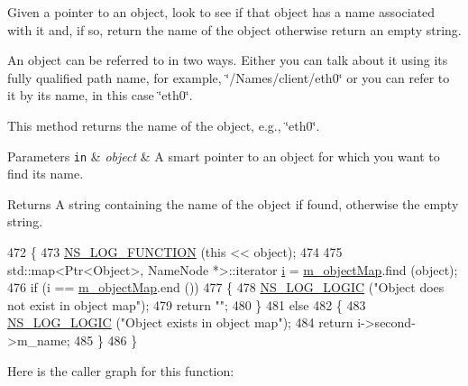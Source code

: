 Given a pointer to an object, look to see if that object has a name associated with it and, if so, return the name of the object otherwise return an empty string. 

An object can be referred to in two ways. Either you can talk about it using its fully qualified path name, for example, \char`\"{}/\+Names/client/eth0\char`\"{} or you can refer to it by its name, in this case \char`\"{}eth0\char`\"{}.

This method returns the name of the object, e.\+g., \char`\"{}eth0\char`\"{}.


\begin{DoxyParams}[1]{Parameters}
\mbox{\tt in}  & {\em object} & A smart pointer to an object for which you want to find its name.\\
\hline
\end{DoxyParams}
\begin{DoxyReturn}{Returns}
A string containing the name of the object if found, otherwise the empty string. 
\end{DoxyReturn}

\begin{DoxyCode}
472 \{
473   \hyperlink{log-macros-disabled_8h_a90b90d5bad1f39cb1b64923ea94c0761}{NS\_LOG\_FUNCTION} (\textcolor{keyword}{this} << \textcolor{keywordtype}{object});
474 
475   std::map<Ptr<Object>, NameNode *>::iterator \hyperlink{bernuolliDistribution_8m_a6f6ccfcf58b31cb6412107d9d5281426}{i} = \hyperlink{classns3_1_1NamesPriv_a19b615be3c0c142fe0ec7539db8598cf}{m\_objectMap}.find (\textcolor{keywordtype}{object});
476   \textcolor{keywordflow}{if} (i == \hyperlink{classns3_1_1NamesPriv_a19b615be3c0c142fe0ec7539db8598cf}{m\_objectMap}.end ())
477     \{
478       \hyperlink{group__logging_ga88acd260151caf2db9c0fc84997f45ce}{NS\_LOG\_LOGIC} (\textcolor{stringliteral}{"Object does not exist in object map"});
479       \textcolor{keywordflow}{return} \textcolor{stringliteral}{""};
480     \}
481   \textcolor{keywordflow}{else}
482     \{
483       \hyperlink{group__logging_ga88acd260151caf2db9c0fc84997f45ce}{NS\_LOG\_LOGIC} (\textcolor{stringliteral}{"Object exists in object map"});
484       \textcolor{keywordflow}{return} i->second->m\_name;
485     \}
486 \}
\end{DoxyCode}


Here is the caller graph for this function\+:


